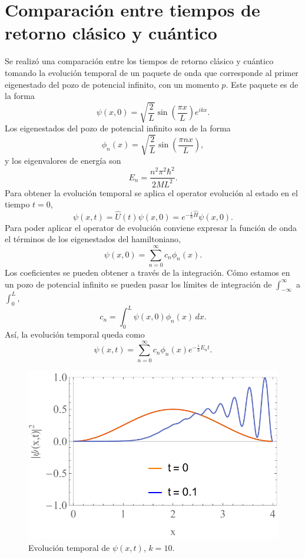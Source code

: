 \documentclass[letterpaper,11pt]{article}
\begin{document}
\section{Comparación entre tiempos de retorno clásico y cuántico}
Se realizó una comparación entre los tiempos de retorno clásico y cuántico tomando la evolución temporal de un paquete de onda que corresponde al primer eigenestado del pozo de potencial infinito, con un momento $p$. Este paquete es de la forma
\[
	\psi (x,0) = \sqrt{\frac{2}{L}} \sin \left(\frac{\pi  x}{L}\right) e^{i k x}.
\]
Los eigenestados del pozo de potencial infinito son de la forma
\[
	\phi_n (x) = \sqrt{\frac{2}{L}} \sin \left(\frac{\pi  n x}{L}\right),
\]
y los eigenvalores de energía son
\[
	E_n = \frac{n^2 \pi ^2 \hbar^2}{2 M L^2}.
\]
Para obtener la evolución temporal se aplica el operator evolución al estado en el tiempo $t = 0$,
\[
	\psi (x,t) = \hat{U}(t) \psi (x,0) = e^{- \frac{i}{\hbar} \hat{H}} \psi (x,0).
\]
Para poder aplicar el operator de evolución conviene expresar la función de onda el términos de los eigenestados del hamiltoniano,
\[
	\psi (x,0) = \sum_{n = 0}^\infty c_n \phi_n(x).
\]
Los coeficientes se pueden obtener a través de la integración. Cómo estamos en un pozo de potencial infinito se pueden pasar los límites de integración de $\int_{-\infty}^\infty$ a $\int_0^L$,
\[
	c_n = \int_0^L \psi (x,0) \phi_n (x) \, dx.
\]
Así, la evolución temporal queda como
\[
	\psi (x,t) = \sum_{n = 0}^\infty c_n \phi_n (x) e^{- \frac{i}{\hbar} E_n t}.
\]

\begin{figure}[h!]
\centering
\includegraphics[scale=0.55]{img/rt_evol}
\caption{Evolución temporal de $\psi(x,t)$, $k = 10$.}
\label{fig:ev}
\end{figure}
\end{document}

